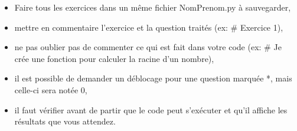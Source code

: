 


\usepackage{enumitem}







\begin{center}
{\Large\bf {\type} \no {\numero}}
\end{center}


\begin{boxedminipage}{.9\textwidth} 
\begin{itemize}
 \item Faire tous les exercices dans un même fichier {NomPrenom.py} à sauvegarder,
 \item mettre en commentaire l'exercice et la question traités (ex: \# Exercice 1),
 \item ne pas oublier pas de commenter ce qui est fait dans votre code (ex: \# Je crée une fonction pour calculer la racine d'un nombre),
 \item il est possible de demander un déblocage pour une question marquée *, mais celle-ci sera notée 0,
 \item il faut vérifier avant de partir que le code peut s'exécuter et qu'il affiche les résultats que vous attendez.
\end{itemize}
\end{boxedminipage}




